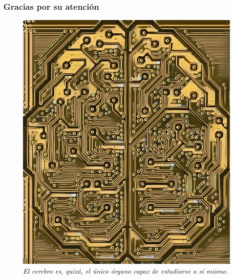 \documentclass{beamer}
\renewcommand{\footnotesize}{\tiny}
\begin{document}

%



\begin{frame}\frametitle{Gracias por su atenci\'on}
\begin{figure}
\centering
\includegraphics[width=0.4\linewidth]{cerebot.jpg}\\
\vspace*{1em}
\textit{El cerebro es, quiz\'a, el \'unico \'organo capaz de estudiarse a s\'i mismo.}
\end{figure}
\end{frame}

\end{document}
